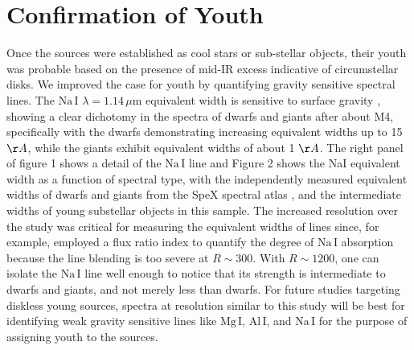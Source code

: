 \section{Confirmation of Youth}
Once the sources were established as cool stars or sub-stellar objects, their youth was probable based on the presence of mid-IR excess \citep{allers06} indicative of circumstellar disks.  We improved the case for youth by quantifying gravity sensitive spectral lines.  The $\mathrm{Na\, I}$ $\lambda=1.14 \,\mu$m equivalent width is sensitive to surface gravity \citep{rayner09}, showing a clear dichotomy in the spectra of dwarfs and giants after about M4, specifically with the dwarfs demonstrating increasing equivalent widths up to 15 $\AA$, while the giants exhibit equivalent widths of about 1 $\AA$.  The right panel of figure 1 shows a detail of the  $\mathrm{Na\, I}$ line and Figure 2 shows the NaI equivalent width as a function of spectral type, with the independently measured equivalent widths of dwarfs and giants from the SpeX spectral atlas \citep{rayner09, cushing05}, and the intermediate widths of young substellar objects in this sample.  The increased resolution over the \citet{allers07} study was critical for measuring the equivalent widths of lines since, for example, \citet{allers07} employed a flux ratio index to quantify the degree of $\mathrm{Na\, I}$ absorption because the line blending is too severe at $R\sim$300.  With $R\sim1200$, one can isolate the $\mathrm{Na\, I}$ line well enough to notice that its strength is intermediate to dwarfs and giants, and not merely less than dwarfs.  For future studies targeting diskless young sources, spectra at resolution similar to this study will be best for identifying weak gravity sensitive lines like $\mathrm{Mg\, I}$, $\mathrm{Al\, I}$, and $\mathrm{Na\, I}$ \citep{rayner09} for the purpose of assigning youth to the sources.  
